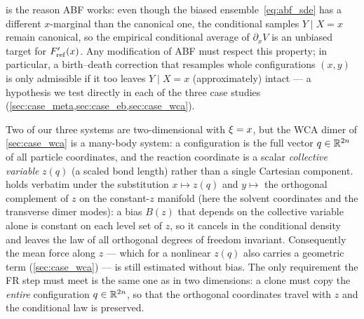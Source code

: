  is the reason ABF works: even though the biased
ensemble~\eqref{eq:abf_sde} has a different $x$-marginal than the canonical
one, the conditional samples $Y\mid X=x$ remain canonical, so the empirical
conditional average of $\partial_x V$ is an unbiased target for
$F'_{\mathrm{ref}}(x)$. Any modification of ABF must respect this property; in particular,
a birth--death correction that resamples whole configurations $(x,y)$ is
only admissible if it too leaves $Y\mid X=x$ (approximately) intact ---
a hypothesis we test directly in each of the three case studies
(\cref{sec:case_meta,sec:case_eb,sec:case_wca}).

\begin{remark}
\label{rem:manybody}
Two of our three systems are two-dimensional with $\xi=x$, but the WCA dimer of
\cref{sec:case_wca} is a many-body system: a configuration is the full vector
$q\in\mathbb{R}^{2n}$ of all particle coordinates, and the reaction coordinate is a
scalar \emph{collective variable} $z(q)$ (a scaled bond length) rather than a
single Cartesian component.  holds verbatim under the
substitution $x\mapsto z(q)$ and $y\mapsto$ the orthogonal complement of $z$ on
the constant-$z$ manifold (here the solvent coordinates and the transverse dimer
modes): a bias $B(z)$ that depends on the collective variable alone is constant
on each level set of $z$, so it cancels in the conditional density and leaves the
law of all orthogonal degrees of freedom invariant. Consequently the mean force
along $z$ --- which for a nonlinear $z(q)$ also carries a geometric term
(\cref{sec:case_wca}) --- is still estimated without bias. The only requirement
the FR step must meet is the same one as in two dimensions: a clone must copy the
\emph{entire} configuration $q\in\mathbb{R}^{2n}$, so that the orthogonal coordinates
travel with $z$ and the conditional law is preserved.
\end{remark}

